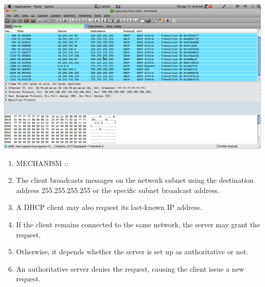 \documentclass[a4paper,12pt,oneside]{article}
\begin{document}
\begin{center}
 \includegraphics[width=13 cm,height=12 cm]{./dhcp.png}
\end{center}


\begin{enumerate}
\item MECHANISM ::
\item The client broadcasts messages on the network subnet using the destination address 255.255.255.255 or the specific subnet broadcast address.
\item A DHCP client may also request its last-known IP address.
\item If the client remains connected to the same network, the server may grant the request. 
\item Otherwise, it depends whether the server is set up as authoritative or not. 
\item An authoritative server denies the request, causing the client issue a new request. 

\end{enumerate}
\end{document}
